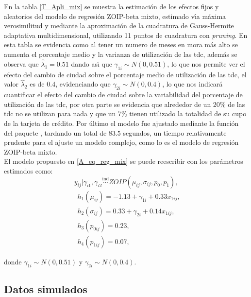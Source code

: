 En la tabla \ref{T_Apli_mix} se muestra la estimaci\'{o}n de los efectos fijos y aleatorios del modelo de regresi\'{o}n ZOIP-beta mixto, estimado v\'{\i}a m\'{a}xima verosimilitud y mediante la aproximaci\'{o}n de la cuadratura de Gauss-Hermite adaptativa multidimensional, utilizando 11 puntos de cuadratura con \textit{pruning}. En esta tabla se evidencia como al tener un numero de meses en mora m\'{a}s alto se aumenta el porcentaje medio y la varianza de utilizaci\'{o}n de las tdc, adem\'{a}s se observa que $\hat{\lambda}_1=0.51$ dando as\'{\i} que $\gamma_{1i} \sim N(0, 0.51)$, lo que nos permite ver el efecto del cambio de ciudad sobre el porcentaje medio de utilizaci\'{o}n de las tdc, el valor $\hat{\lambda}_2$ es de $0.4$, evidenciando que $\gamma_{2i} \sim N(0, 0.4)$, lo que nos indicar\'{a} cuantificar el efecto del cambio de ciudad sobre la variabilidad del porcentaje de utilizaci\'{o}n de las tdc, por otra parte se evidencia que alrededor de un 20\% de las tdc no se utilizan para nada y que un 7\% tienen utilizado la totalidad de su cupo de la tarjeta de cr\'{e}dito. Por \'{u}ltimo el modelo fue ajustado mediante la funci\'{o}n  del paquete , tardando un total de 83.5 segundos, un tiempo relativamente prudente para el ajuste un modelo complejo, como lo es el modelo de regresi\'{o}n ZOIP-beta mixto.\\

El modelo propuesto en \eqref{A_eq_reg_mix} se puede reescribir con los par\'{a}metros estimados como:
\[
y_{ij}| \gamma_{i1},\gamma_{i2} \overset{\text{ind}}{\sim} ZOIP(\mu_{ij},\sigma_{ij},p_0, p_1),
\]
\begin{equation}
\begin{split}
&h_1(\mu_{ij})=-1.13+\gamma_{1i}+0.33 x_{1ij},\\
&h_2(\sigma_{ij})=0.33+\gamma_{2i}+0.14 x_{1ij},\\
&h_3(p_{0ij})=0.23,\\
&h_4(p_{1ij}) =0.07,
\end{split}
\label{A_eq_reg_mix2}
\end{equation}

donde $\gamma_{1i} \sim N(0, 0.51)$ y $\gamma_{2i} \sim N(0, 0.4)$.

\subsection{Datos simulados}

